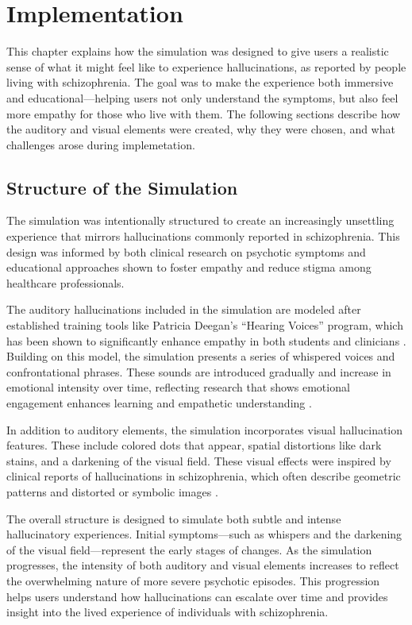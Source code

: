 \chapter{Implementation}
\label{ch:implementation}

This chapter explains how the simulation was designed to give users a realistic sense of what it might feel like to experience hallucinations, as reported by people living with schizophrenia. The goal was to make the experience both immersive and educational—helping users not only understand the symptoms, but also feel more empathy for those who live with them. The following sections describe how the auditory and visual elements were created, why they were chosen, and what challenges arose during implemetation.

\section{Structure of the Simulation}

The simulation was intentionally structured to create an increasingly unsettling experience that mirrors hallucinations commonly reported in schizophrenia. This design was informed by both clinical research on psychotic symptoms and educational approaches shown to foster empathy and reduce stigma among healthcare professionals.

The auditory hallucinations included in the simulation are modeled after established training tools like Patricia Deegan’s “Hearing Voices” program, which has been shown to significantly enhance empathy in both students and clinicians \cite{Hsia2022}. Building on this model, the simulation presents a series of whispered voices and confrontational phrases. These sounds are introduced gradually and increase in emotional intensity over time, reflecting research that shows emotional engagement enhances learning and empathetic understanding \cite{Skoy2016}.

In addition to auditory elements, the simulation incorporates visual hallucination features. These include colored dots that appear, spatial distortions like dark stains, and a darkening of the visual field. These visual effects were inspired by clinical reports of hallucinations in schizophrenia, which often describe geometric patterns and distorted or symbolic images \cite{Silverstein2021,Vanommen2019}.

The overall structure is designed to simulate both subtle and intense hallucinatory experiences. Initial symptoms—such as whispers and the darkening of the visual field—represent the early stages of changes. As the simulation progresses, the intensity of both auditory and visual elements increases to reflect the overwhelming nature of more severe psychotic episodes. This progression helps users understand how hallucinations can escalate over time and provides insight into the lived experience of individuals with schizophrenia.


